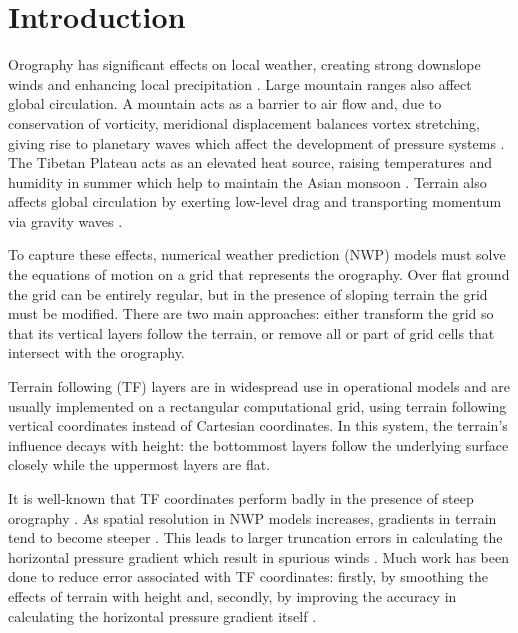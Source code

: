 \chapter{Introduction}

Orography has significant effects on local weather, creating strong downslope winds and enhancing local precipitation \autocite{barry2008}.
Large mountain ranges also affect global circulation.  A mountain acts as a barrier to air flow and, due to conservation of vorticity, meridional displacement balances vortex stretching, giving rise to planetary waves which affect the development of pressure systems \autocite{barry2008}.
The Tibetan Plateau acts as an elevated heat source, raising temperatures and humidity in summer which help to maintain the Asian monsoon \parencites{ye1981}{luo-yanai1983}.
Terrain also affects global circulation by exerting low-level drag \autocite{lott-miller1997} and transporting momentum via gravity waves \autocite{mcfarlane1987}.

To capture these effects, numerical weather prediction (NWP) models must solve the equations of motion on a grid that represents the orography.
Over flat ground the grid can be entirely regular, but in the presence of sloping terrain the grid must be modified.  There are two main approaches: either transform the grid so that its vertical layers follow the terrain, or remove all or part of grid cells that intersect with the orography.

Terrain following (TF) layers are in widespread use in operational models and are usually implemented on a rectangular computational grid, using terrain following vertical coordinates instead of Cartesian coordinates.  In this system, the terrain's influence decays with height: the bottommost layers follow the underlying surface closely while the uppermost layers are flat.

It is well-known that TF coordinates perform badly in the presence of steep orography \autocite{gary1973}.  As spatial resolution in NWP models increases, gradients in terrain tend to become steeper \autocite{steppeler2002}.  This leads to larger truncation errors in calculating the horizontal pressure gradient which result in spurious winds \autocite{dempsey-davis1998}.  Much work has been done to reduce error associated with TF coordinates: firstly, by smoothing the effects of terrain with height \parencites{simmons-burridge1981}{schaer2002}{leuenberger2010}{klemp2011} and, secondly, by improving the accuracy in calculating the horizontal pressure gradient itself \parencites{mahrer1984}{klemp2011}{zaengl2012}.

